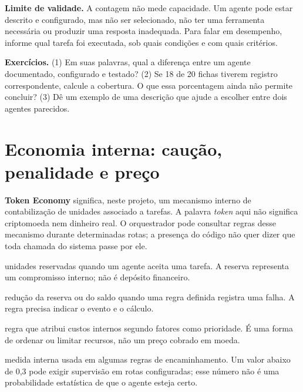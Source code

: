 \begin{aviso}
\textbf{Limite de validade.} A contagem não mede capacidade. Um agente pode estar
descrito e configurado, mas não ser selecionado, não ter uma ferramenta
necessária ou produzir uma resposta inadequada. Para falar em desempenho,
informe qual tarefa foi executada, sob quais condições e com quais critérios.
\end{aviso}

\begin{resultado}
\textbf{Exercícios.} (1) Em suas palavras, qual a diferença entre um agente
documentado, configurado e testado? (2) Se 18 de 20 fichas tiverem registro
correspondente, calcule a cobertura. O que essa porcentagem ainda não permite
concluir? (3) Dê um exemplo de uma descrição que ajude a escolher entre dois
agentes parecidos.
\end{resultado}

\section[Economia interna]{Economia interna: caução, penalidade e preço}

\begin{processo}
\textbf{Token Economy} significa, neste projeto, um mecanismo interno de
contabilização de unidades associado a tarefas. A palavra \emph{token} aqui não
significa criptomoeda nem dinheiro real. O orquestrador pode consultar regras
desse mecanismo durante determinadas rotas; a presença do código não quer dizer
que toda chamada do sistema passe por ele.
\end{processo}

\begin{resultado}
\begin{description}[leftmargin=2.6cm,style=nextline]
  \item[Stake (caução)] unidades reservadas quando um agente aceita uma tarefa.
        A reserva representa um compromisso interno; não é depósito financeiro.
  \item[Slashing (desconto)] redução da reserva ou do saldo quando uma regra
        definida registra uma falha. A regra precisa indicar o evento e o cálculo.
  \item[Fee market (preço da tarefa)] regra que atribui custos internos segundo
        fatores como prioridade. É uma forma de ordenar ou limitar recursos, não
        um preço cobrado em moeda.
  \item[Trust score (indicador de confiança)] medida interna usada em algumas
        regras de encaminhamento. Um valor abaixo de 0,3 pode exigir supervisão
        em rotas configuradas; esse número não é uma probabilidade estatística
        de que o agente esteja certo.
\end{description}
\end{resultado}

